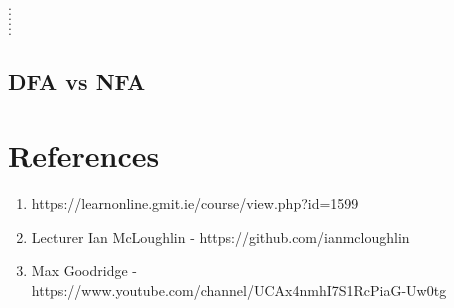 \documentclass[11pt]{article}
\begin{document}
\begin{description}
\item[$\cdot$] 
\item[$\cdot$]
\item[$\cdot$]
\item[$\cdot$]
\item[$\cdot$]
\item[$\cdot$]
\end{description}

\subsection{DFA vs NFA}


\newpage

\section{References}

\begin{enumerate}
\item https://learnonline.gmit.ie/course/view.php?id=1599
\item Lecturer Ian McLoughlin - https://github.com/ianmcloughlin
\item Max Goodridge - https://www.youtube.com/channel/UCAx4nmhI7S1RcPiaG-Uw0tg
\end{enumerate}
\end{document}
